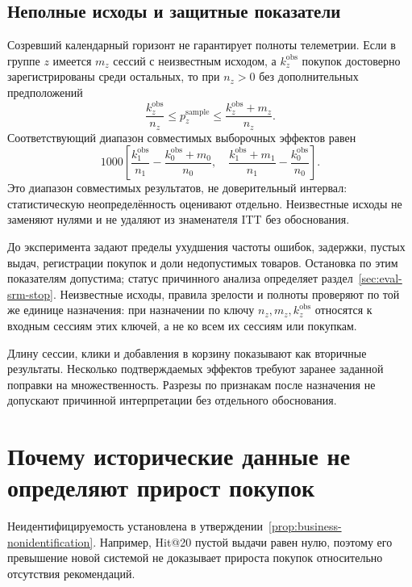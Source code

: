 \documentclass[12pt,a4paper]{article}
\theoremstyle{plainru}
\begin{document}
\subsection{Неполные исходы и защитные показатели}
\label{sec:eval-missing}

Созревший календарный горизонт не гарантирует полноты телеметрии.
Если в группе $z$ имеется $m_z$ сессий с неизвестным исходом,
а $k_z^{\mathrm{obs}}$ покупок достоверно зарегистрированы среди остальных,
то при $n_z>0$ без дополнительных предположений
\begin{equation}\label{eq:eval-missing-rate}
 \frac{k_z^{\mathrm{obs}}}{n_z}\le p_z^{\mathrm{sample}}
 \le\frac{k_z^{\mathrm{obs}}+m_z}{n_z}.
\end{equation}
Соответствующий диапазон совместимых выборочных эффектов равен
\begin{equation}\label{eq:eval-missing-effect}
 1000\left[
 \frac{k_1^{\mathrm{obs}}}{n_1}
 -\frac{k_0^{\mathrm{obs}}+m_0}{n_0},\quad
 \frac{k_1^{\mathrm{obs}}+m_1}{n_1}
 -\frac{k_0^{\mathrm{obs}}}{n_0}\right].
\end{equation}
Это диапазон совместимых результатов, не доверительный интервал:
статистическую неопределённость оценивают отдельно. Неизвестные исходы
не заменяют нулями и не удаляют из знаменателя ITT без обоснования.

До эксперимента задают пределы ухудшения частоты ошибок, задержки,
пустых выдач, регистрации покупок и доли недопустимых товаров.
Остановка по этим показателям допустима; статус причинного анализа
определяет раздел~\ref{sec:eval-srm-stop}. Неизвестные исходы,
правила зрелости и полноты проверяют по той же единице назначения:
при назначении по ключу $n_z,m_z,k_z^{\mathrm{obs}}$ относятся к
входным сессиям этих ключей, а не ко всем их сессиям или покупкам.

Длину сессии, клики и добавления в корзину показывают как вторичные
результаты. Несколько подтверждаемых эффектов требуют заранее заданной
поправки на множественность. Разрезы по признакам после назначения
не допускают причинной интерпретации без отдельного обоснования.

\section{Почему исторические данные не определяют прирост покупок}
\label{sec:eval-identification}

Неидентифицируемость установлена в утверждении~\ref{prop:business-nonidentification}.
Например, Hit@20 пустой выдачи равен нулю, поэтому его превышение новой
системой не доказывает прироста покупок относительно отсутствия рекомендаций.
\end{document}
